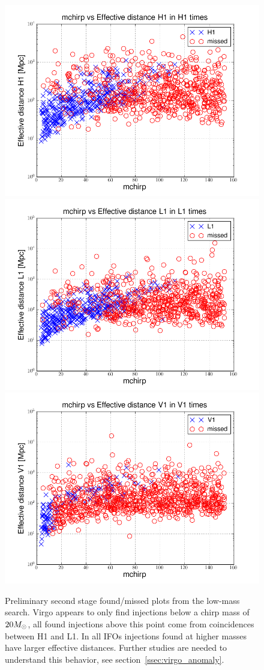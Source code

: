 \begin{figure}
  \includegraphics[width=0.5\linewidth]{figures/ninja2_results/H1-plotinspmissed_LOW_FULL_DATA_mchirp-eff_dist-log-H1-871147552-5209912} 
  \includegraphics[width=0.5\linewidth]{figures/ninja2_results/L1-plotinspmissed_LOW_FULL_DATA_mchirp-eff_dist-log-L1-871147552-5209912} \\
  \includegraphics[width=0.5\linewidth]{figures/ninja2_results/V1-plotinspmissed_LOW_FULL_DATA_mchirp-eff_dist-log-V1-871147552-5209912} \\
  \caption[Second stage found/missed plots from the low-mass search]{
  \label{f:ninja2_cbc_results_low_second}
Preliminary second stage found/missed plots from
the low-mass search.  Virgo appears to only find injections below a
chirp mass of $20 M_\odot$, all found injections above this point come
from coincidences between H1 and L1.  In all IFOs injections found at
higher masses have larger effective distances.  Further studies are
needed to understand this behavior, see
section~\ref{ssec:virgo_anomaly}.
}
\end{figure}%

